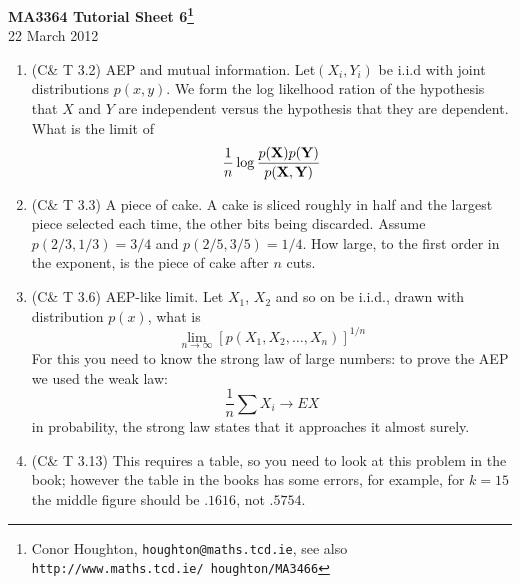 \documentclass[12pt]{article}
\begin{document}
\begin{center}
{\bf MA3364 Tutorial Sheet 6\footnote{Conor Houghton, {\tt houghton@maths.tcd.ie}, see also {\tt http://www.maths.tcd.ie/ houghton/MA3466}}}\\[1cm]{} 22 March 2012
\end{center}
\begin{enumerate}

\item (C\& T 3.2) AEP and mutual information. Let$(X_i,Y_i)$ be i.i.d with joint distributions $p(x,y)$. We form the log likelhood ration of the hypothesis that $X$ and $Y$ are independent versus the hypothesis that they are dependent. What is the limit of 
\begin{equation}
\frac{1}{n}\log{\frac{p({\bf X})p({\bf Y})}{p({\bf X},{\bf Y})}}
\end{equation}

\item (C\& T 3.3) A piece of cake. A cake is sliced roughly in half and the largest piece selected each time, the other bits being discarded. Assume $p(2/3,1/3)=3/4$ and $p(2/5,3/5)=1/4$. How large, to the first order in the exponent, is the piece of cake after $n$ cuts.

\item (C\& T 3.6) AEP-like limit. Let $X_1$, $X_2$ and so on be i.i.d., drawn with distribution $p(x)$, what is
\begin{equation}
\lim_{n\rightarrow \infty}[p(X_1,X_2,\ldots,X_n)]^{1/n}
\end{equation}
For this you need to know the strong law of large numbers: to prove the AEP we used the weak law:
\begin{equation}
\frac{1}{n}\sum X_i \rightarrow EX
\end{equation}
in probability, the strong law states that it approaches it almost surely.

\item (C\& T 3.13) This requires a table, so you need to look at this
  problem in the book; however the table in the books has some errors,
  for example, for $k=15$ the middle figure should be $.1616$, not
  $.5754$.



\end{enumerate}
\end{document}
